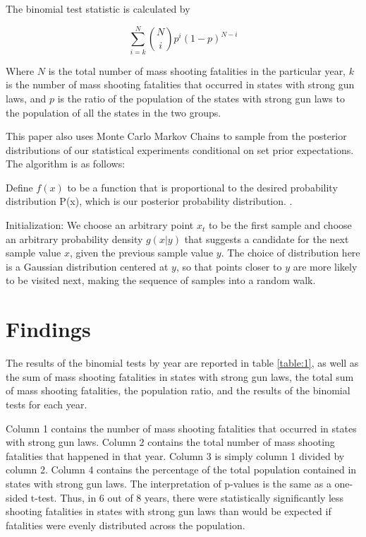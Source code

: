 \documentclass{article}
\begin{document}
The binomial test statistic is calculated by

\begin{equation}
\sum_{i=k}^{N} \binom{N}{i}p^{i}(1-p)^{N-i}
\end{equation}

Where $N$ is the total number of mass shooting fatalities in the particular year, $k$ is the number of mass shooting fatalities that occurred in states with strong gun laws, and $p$ is the ratio of the population of the states with strong gun laws to the population of all the states in the two groups.  

This paper also uses Monte Carlo Markov Chains to sample from the posterior distributions of our statistical experiments conditional on set prior expectations. The algorithm is as follows:

Define $f(x)$ to be a function that is proportional to the desired probability distribution P(x), which is our posterior probability distribution. .

Initialization: We choose an arbitrary point $x_t$ to be the first sample and choose an arbitrary probability density $g(x| y)$ that suggests a candidate for the next sample value $x$, given the previous sample value $y$. The choice of distribution here is a Gaussian distribution centered at $y$, so that points closer to $y$ are more likely to be visited next, making the sequence of samples into a random walk.

\section{Findings}

The results of the binomial tests by year are reported in table \ref{table:1}, as well as the sum of mass shooting fatalities in states with strong gun laws, the total sum of mass shooting fatalities, the population ratio, and the results of the binomial tests for each year.  

Column 1 contains the number of mass shooting fatalities that occurred in states with strong gun laws. Column 2 contains the total number of mass shooting fatalities that happened in that year. Column 3 is simply column 1 divided by column 2. Column 4 contains the percentage of the total population contained in states with strong gun laws. The interpretation of p-values is the same as a one-sided t-test. Thus, in 6 out of 8 years, there were statistically significantly less shooting fatalities in states with strong gun laws than would be expected if fatalities were evenly distributed across the population. 
 
\end{document}
